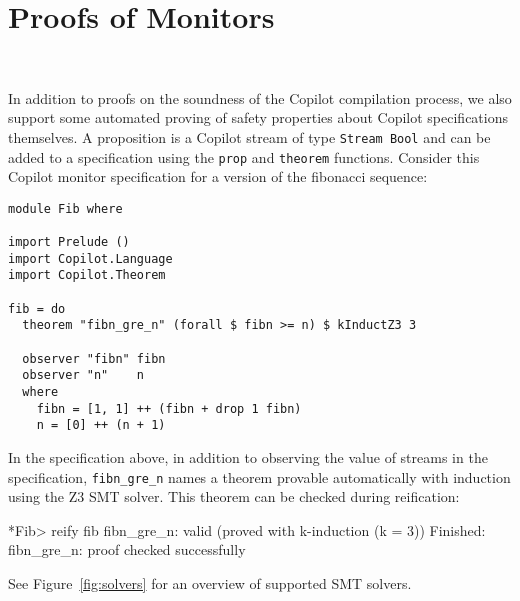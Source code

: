 \section{Proofs of Monitors}~\label{sec:proof}

In addition to proofs on the soundness of the Copilot compilation process, we
also support some automated proving of safety properties about Copilot
specifications themselves. A proposition is a Copilot stream of type
\lstinline{Stream Bool} and can be added to a specification using the
\lstinline{prop} and \lstinline{theorem} functions. Consider this Copilot
monitor specification for a version of the fibonacci sequence:

\begin{lstlisting}[language = Copilot]
module Fib where

import Prelude ()
import Copilot.Language
import Copilot.Theorem

fib = do
  theorem "fibn_gre_n" (forall $ fibn >= n) $ kInductZ3 3

  observer "fibn" fibn
  observer "n"    n
  where
    fibn = [1, 1] ++ (fibn + drop 1 fibn)
    n = [0] ++ (n + 1)
\end{lstlisting}

In the specification above, in addition to observing the value of streams in
the specification, \lstinline{fibn_gre_n} names a theorem provable
automatically with induction using the Z3 SMT solver. This theorem can be
checked during reification:

\begin{code}
*Fib> reify fib
fibn_gre_n: valid (proved with k-induction (k = 3))
Finished: fibn_gre_n: proof checked successfully
\end{code}

See Figure~\ref{fig:solvers} for an overview of supported SMT solvers.

\newcommand{\Yes}{\checkmark}
\newcommand{\No}{\textsf{X}}
\newcommand{\Some}{\textsf{Some}}

